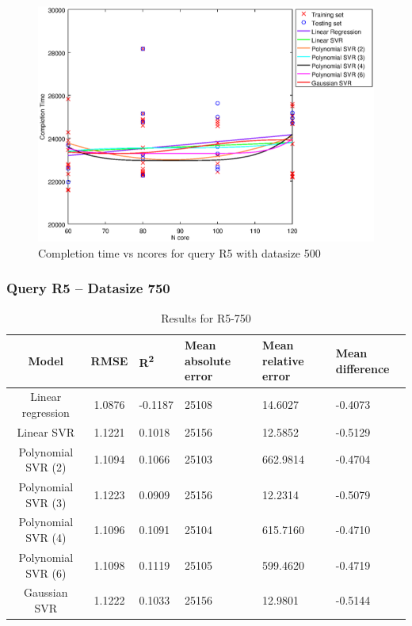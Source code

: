 \documentclass[a4paper,11pt]{article}
\begin{document}
\begin {figure}[hbtp]
\centering
\includegraphics[width=\textwidth]{output/R5_500_ONLY_1_LINEAR_NCORE/plot_R5_500.eps}
\caption{Completion time vs ncores for query R5 with datasize 500}
\label{fig:coreonly_linear_R5_500}
\end {figure}

\newpage
\subsubsection{Query R5 -- Datasize 750}
\begin{table}[H]
	\centering
	\begin{adjustbox}{center}
		\begin{tabular}{c | c M{1.2cm} M{2.5cm} M{2.5cm} M{1.8cm}}
			Model & RMSE & R\textsuperscript{2} & Mean absolute error & Mean relative error & Mean difference \tabularnewline
			\hline
			Linear regression & 1.0876 & -0.1187 &  25108 & 14.6027 & -0.4073 \\
			Linear SVR & 1.1221 & 0.1018 &  25156 & 12.5852 & -0.5129 \\
			Polynomial SVR (2) & 1.1094 & 0.1066 &  25103 & 662.9814 & -0.4704 \\
			Polynomial SVR (3) & 1.1223 & 0.0909 &  25156 & 12.2314 & -0.5079 \\
			Polynomial SVR (4) & 1.1096 & 0.1091 &  25104 & 615.7160 & -0.4710 \\
			Polynomial SVR (6) & 1.1098 & 0.1119 &  25105 & 599.4620 & -0.4719 \\
			Gaussian SVR & 1.1222 & 0.1033 &  25156 & 12.9801 & -0.5144 \\
		\end{tabular}
	\end{adjustbox}
	\\
	\caption{Results for R5-750}
	\label{fig:coreonly_linear_R5_750}
\end{table}
\end{document}
